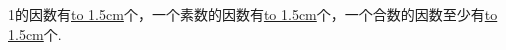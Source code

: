 1的因数有\underline{\hbox to 1.5cm{}}个，一个素数的因数有\underline{\hbox to 1.5cm{}}个，一个合数的因数至少有\underline{\hbox to 1.5cm{}}个.